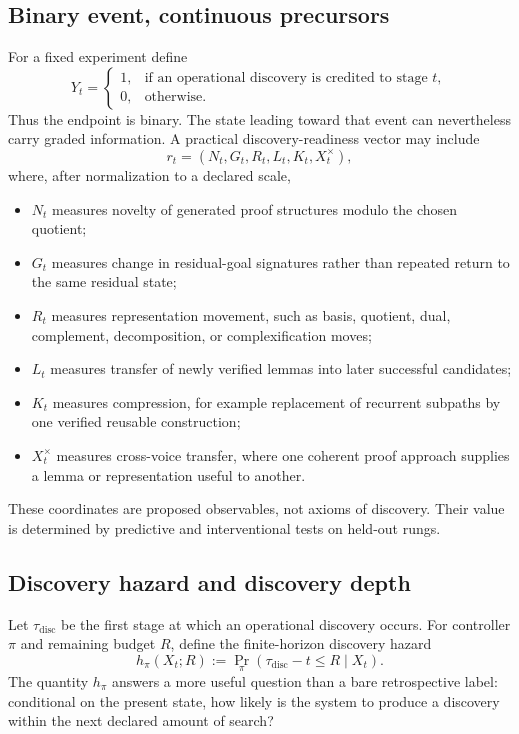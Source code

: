 \subsection{Binary event, continuous precursors}
For a fixed experiment define
\[
Y_t=
\begin{cases}
1,&\text{if an operational discovery is credited to stage }t,\\
0,&\text{otherwise.}
\end{cases}
\]
Thus the endpoint is binary. The state leading toward that event can nevertheless carry graded information. A practical discovery-readiness vector may include
\[
r_t=(N_t,G_t,R_t,L_t,K_t,X_t^{\times}),
\]
where, after normalization to a declared scale,
\begin{itemize}
\item $N_t$ measures novelty of generated proof structures modulo the chosen quotient;
\item $G_t$ measures change in residual-goal signatures rather than repeated return to the same residual state;
\item $R_t$ measures representation movement, such as basis, quotient, dual, complement, decomposition, or complexification moves;
\item $L_t$ measures transfer of newly verified lemmas into later successful candidates;
\item $K_t$ measures compression, for example replacement of recurrent subpaths by one verified reusable construction;
\item $X_t^{\times}$ measures cross-voice transfer, where one coherent proof approach supplies a lemma or representation useful to another.
\end{itemize}
These coordinates are proposed observables, not axioms of discovery. Their value is determined by predictive and interventional tests on held-out rungs.

\subsection{Discovery hazard and discovery depth}
Let $\tau_{\mathrm{disc}}$ be the first stage at which an operational discovery occurs. For controller $\pi$ and remaining budget $R$, define the finite-horizon discovery hazard
\[
h_{\pi}(X_t;R)
:=
\Pr_{\pi}\!\left(\tau_{\mathrm{disc}}-t\le R\mid X_t\right).
\]
The quantity $h_{\pi}$ answers a more useful question than a bare retrospective label: conditional on the present state, how likely is the system to produce a discovery within the next declared amount of search?

